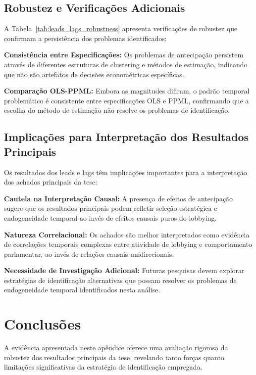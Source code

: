 \subsection{Robustez e Verificações Adicionais}

A Tabela~\ref{tab:leads_lags_robustness} apresenta verificações de robustez que confirmam a persistência dos problemas identificados:



\textbf{Consistência entre Especificações:} Os problemas de antecipação persistem através de diferentes estruturas de clustering e métodos de estimação, indicando que não são artefatos de decisões econométricas específicas.

\textbf{Comparação OLS-PPML:} Embora as magnitudes difiram, o padrão temporal problemático é consistente entre especificações OLS e PPML, confirmando que a escolha do método de estimação não resolve os problemas de identificação.

\subsection{Implicações para Interpretação dos Resultados Principais}

Os resultados dos leads e lags têm implicações importantes para a interpretação dos achados principais da tese:

\textbf{Cautela na Interpretação Causal:} A presença de efeitos de antecipação sugere que os resultados principais podem refletir seleção estratégica e endogeneidade temporal ao invés de efeitos causais puros do lobbying.

\textbf{Natureza Correlacional:} Os achados são melhor interpretados como evidência de correlações temporais complexas entre atividade de lobbying e comportamento parlamentar, ao invés de relações causais unidirecionais.

\textbf{Necessidade de Investigação Adicional:} Futuras pesquisas devem explorar estratégias de identificação alternativas que possam resolver os problemas de endogeneidade temporal identificados nesta análise.

\section{Conclusões}

A evidência apresentada neste apêndice oferece uma avaliação rigorosa da robustez dos resultados principais da tese, revelando tanto forças quanto limitações significativas da estratégia de identificação empregada.

